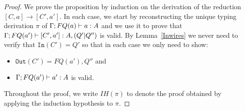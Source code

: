 \documentclass{article}
\begin{document}
\begin{proof}
We prove the proposition by induction on the derivation of the reduction 
 $[C,a]\to[C',a']$. In each case, we start by reconstructing 
the unique typing derivation $\pi$ of $\Gamma;FQ(a)\vdash a:A$ and we use 
it to prove that $\Gamma;FQ(a')\vdash [C',a']:A,(Q'|Q'')$ is valid. 
By Lemma~\hyperref[Inwires]{\ref*{Inwires}} we never need to 
verify that $\mathtt{In}(C')=Q'$ so that in each case we only 
need to show:
\begin{itemize}
  \item $\mathtt{Out}(C')=FQ(a'),Q''$ and
  \item $\Gamma;FQ(a')\vdash a':A$ is valid.
\end{itemize}
Throughout the proof, we write $IH(\pi)$ to denote the proof obtained by applying 
the induction hypothesis to $\pi$.


\end{proof}
\end{document}
